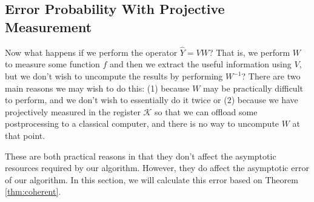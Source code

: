 \subsection{Error Probability With Projective Measurement}
\label{subsec:error-proj}

Now what happens if we perform the operator $\hat{Y} = VW$? That is, we
perform $W$ to measure some function $f$ and then we extract the useful
information using $V$, but we don't wish to uncompute the results by
performing $W^{-1}$? There are two main reasons we may wish to do this:
(1) because $W$ may be practically difficult to perform, and we don't wish
to essentially do it twice or (2) because we have projectively measured
in the register $\mathcal{K}$ so that we can offload some postprocessing to
a classical computer, and there is no way to uncompute $W$ at that point.

These are both practical reasons in that they don't affect the
asymptotic resources required by our algorithm. However, they do affect
the asymptotic error of our algorithm. In this section, we will calculate
this error based on Theorem \ref{thm:coherent}.


